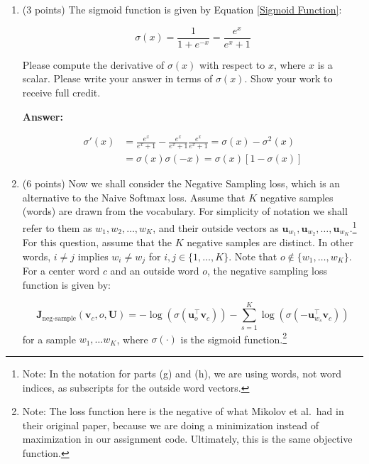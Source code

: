 \documentclass{article}
\newenvironment{answer}{
    {\bf Answer:} \sf \begingroup\color{red}
}{\endgroup}%
\begin{document}
\begin{enumerate}[label=(\alph*)]
\item (3 points) The sigmoid function is given by Equation \ref{Sigmoid Function}:

\begin{equation}
    \label{Sigmoid Function}
    \sigma (x) = \frac{1}{1 + e^{-x}} = \frac{e^{x}}{e^{x} + 1}
\end{equation}

Please compute the derivative of $\sigma(x)$ with respect to $x$, where $x$ is a scalar. Please write your answer in terms of $\sigma(x)$. Show your work to receive full credit.

\begin{shaded}
\begin{answer}
\begin{align}
    \sigma'(x) &= \frac{e^{x}}{e^{x} + 1} - \frac{e^x}{e^{x} + 1}\frac{e^{x}}{e^{x} + 1} 
            = \sigma(x) - \sigma^2(x)	\\
            &= \sigma(x)\sigma(-x)
            = \sigma(x)\left[ 1 - \sigma(x) \right]
\end{align}
\end{answer}
\end{shaded}

\item (6 points) Now we shall consider the Negative Sampling loss, which is an alternative to the Naive Softmax loss.  Assume that $K$ negative samples (words) are drawn from the vocabulary. For simplicity of notation we shall refer to them as $w_1, w_2, \dots, w_K$, and their outside vectors as $\bm u_{w_1}, \bm u_{w_2}, \dots, \bm u_{w_K}$.\footnote{Note: In the notation for parts (g) and (h), we are using words, not word indices, as subscripts for the outside word vectors.} For this question, assume that the $K$ negative samples are distinct. In other words, $i\neq j$ implies $w_i\neq w_j$ for $i,j\in\{1,\dots,K\}$.
Note that $o\notin\{w_1, \dots, w_K\}$. 
For a center word $c$ and an outside word $o$, the negative sampling loss function is given by:

\begin{equation}
\bm J_{\text{neg-sample}}(\bm v_c, o, \bm U) = -\log(\sigma(\bm u_o^\top \bm v_c)) - \sum_{s=1}^K \log(\sigma(-\bm u_{w_s}^\top \bm v_c))
\end{equation}
for a sample $w_1, \ldots w_K$, where $\sigma(\cdot)$ is the sigmoid function.\footnote{Note: The loss function here is the negative of what Mikolov et al.\ had in their original paper, because we are doing a minimization instead of maximization in our assignment code. Ultimately, this is the same objective function.}


\end{enumerate}
\end{document}

